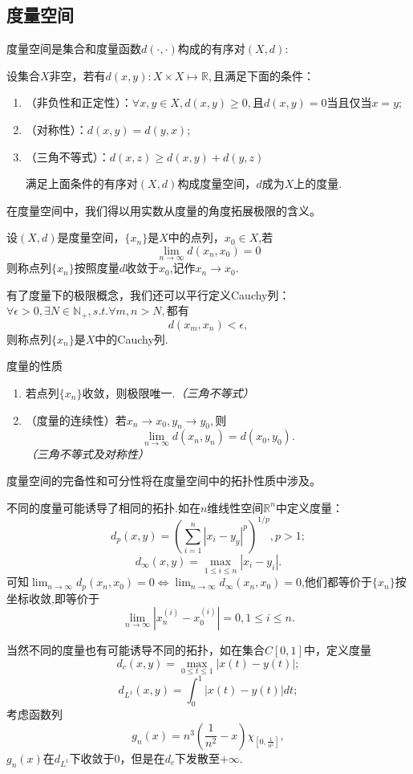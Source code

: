 \documentclass[lang=cn,10pt]{elegantbook}
\begin{document}
	\subsection{度量空间}
	度量空间是集合和度量函数\(d(\cdot,\cdot)\)构成的有序对\((X,d)\):
	\begin{definition}[度量空间]
		设集合\(X\)非空，若有\(d(x,y):X\times X \longmapsto \mathbb{R},\)且满足下面的条件：
		\begin{enumerate}
			\item （非负性和正定性）：\(\forall x,y \in X,d(x,y)\ge0,\)且\(d(x,y)=0\)当且仅当\(x=y\);
			\item （对称性）：\(d(x,y)=d(y,x);\)
			\item （三角不等式）：\(d(x,z)\ge d(x,y)+d(y,z)\)
			
			满足上面条件的有序对\((X,d)\)构成度量空间，\(d\)成为\(X\)上的度量.
		\end{enumerate}
	\end{definition}
	在度量空间中，我们得以用实数从度量的角度拓展极限的含义。
	\begin{definition}[度量空间中的极限]
		设\((X,d)\)是度量空间，\(\{x_n\}\)是\(X\)中的点列，\(x_0 \in X\),若
		\[\lim_{n\to \infty}d(x_n,x_0)=0\]
		则称点列\(\{x_n\}\)按照度量\(d\)收敛于\(x_0\),记作\(x_n \to x_0\).
		
		有了度量下的极限概念，我们还可以平行定义Cauchy列：\(\forall \epsilon>0,\exists N\in \mathbb{N}_+,s.t.\forall m,n>N,\)都有
		\[d(x_m,x_n)<\epsilon,\]
		则称点列\(\{x_n\}\)是\(X\)中的Cauchy列.
	\end{definition}
	\begin{property}
		度量的性质
		\begin{enumerate}
			\item 若点列\(\{x_n\}\)收敛，则极限唯一.\textit{（三角不等式）}
			\item （度量的连续性）若\(x_n \to x_0,y_n\to y_0,\)则
			\[\lim_{n\to \infty}d(x_n,y_n)=d(x_0,y_0).\]
			\textit{（三角不等式及对称性）}
		\end{enumerate}
	\end{property}
	度量空间的完备性和可分性将在度量空间中的拓扑性质中涉及。
	\begin{example}
		不同的度量可能诱导了相同的拓扑.如在\(n\)维线性空间\(\mathbb{R}^n\)中定义度量：
		\[d_p(x,y)=(\sum_{i=1}^{n} |x_i-y_y|^p)^{1/p},p>1;\]
		\[d_\infty(x,y)=\max_{1\le i\le n}|x_i-y_i|.\]
		可知\(\lim_{n \to \infty}d_p(x_n,x_0)=0 \Leftrightarrow \lim_{n \to \infty}d_{\infty}(x_n,x_0)=0\),他们都等价于\(\{x_n\}\)按坐标收敛,即等价于\[\lim_{n \to \infty}|x_n^{(i)}-x_0^{(i)}|=0,1\le i\le n.\]
	\end{example}
	\begin{example}
		当然不同的度量也有可能诱导不同的拓扑，如在集合\(C[0,1]\)中，定义度量
		\[d_c(x,y)=\max_{0\le t \le 1}|x(t)-y(t)|;\]
		\[d_{L^1}(x,y)=\int_{0}^{1}|x(t)-y(t)|dt;\]
		考虑函数列\[g_n(x)=n^3(\frac{1}{n^2}-x)\chi_{[0,\frac{1}{n^2}]},\]
		\(g_n(x)\)在\(d_{L^1}\)下收敛于0，但是在\(d_c\)下发散至\(+\infty\).
	\end{example}
	
\end{document}
